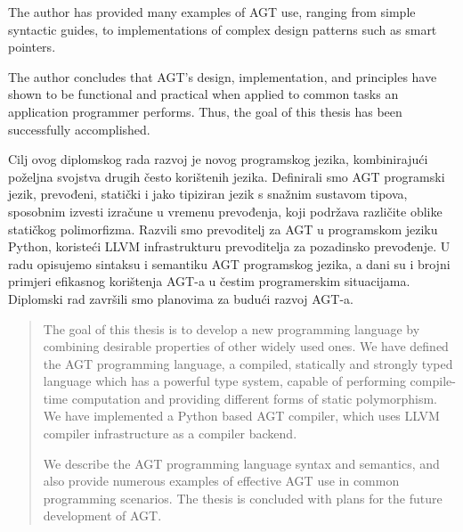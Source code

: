 \documentclass[times, utf8, diplomski]{fer}
\theoremstyle{definition}
\begin{document}
The author has provided many examples of AGT use, ranging from simple syntactic guides,
to implementations of complex design patterns such as smart pointers.

The author concludes that AGT's design, implementation, and principles have shown to be
functional and practical when applied to common tasks an application programmer performs. 
Thus, the goal of this thesis has been successfully accomplished.




\newpage


\begin{sazetak}
Cilj ovog diplomskog rada razvoj je novog programskog jezika,
kombinirajući poželjna svojstva drugih često korištenih jezika.
Definirali smo AGT programski jezik, prevođeni, statički i jako tipiziran jezik
s snažnim sustavom tipova, sposobnim izvesti izračune u vremenu prevođenja,
koji podržava različite oblike statičkog polimorfizma.
Razvili smo prevoditelj za AGT u programskom jeziku Python,
koristeći LLVM infrastrukturu prevoditelja za pozadinsko prevođenje.
U radu opisujemo sintaksu i semantiku AGT programskog jezika, 
a dani su i brojni primjeri efikasnog korištenja AGT-a u čestim programerskim situacijama.
Diplomski rad završili smo planovima za budući razvoj AGT-a.

\end{sazetak}

\begin{abstract}
The goal of this thesis is to develop a new programming language by combining
desirable properties of other widely used ones. We have defined the AGT
programming language, a compiled, statically and strongly typed language which
has a powerful
type system, capable of performing compile-time computation and providing 
different forms of static polymorphism. We have implemented a Python based AGT compiler,
which uses LLVM compiler infrastructure as a compiler backend. 

We describe the AGT programming language syntax and semantics, and 
also provide numerous examples of effective AGT use in common programming scenarios.
The thesis is concluded with plans for the future development of AGT.

\end{abstract}
\end{document}
